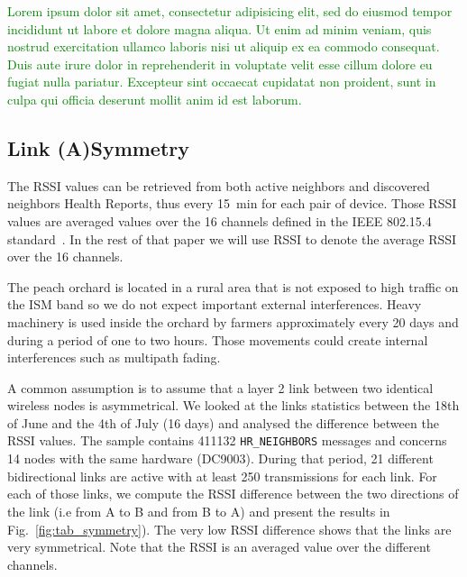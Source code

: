 \documentclass{sig-alternate}
\newcommand{\lorem}          {\textcolor{green}{Lorem ipsum dolor sit amet, consectetur adipisicing elit, sed do eiusmod tempor incididunt ut labore et dolore magna aliqua. Ut enim ad minim veniam, quis nostrud exercitation ullamco laboris nisi ut aliquip ex ea commodo consequat. Duis aute irure dolor in reprehenderit in voluptate velit esse cillum dolore eu fugiat nulla pariatur. Excepteur sint occaecat cupidatat non proident, sunt in culpa qui officia deserunt mollit anim id est laborum.}}
\newcommand{\HRNEIGHBORS}    {{\tt HR\_NEIGHBORS}\xspace}
\begin{document}
\lorem

\subsection{Link (A)Symmetry}
\label{sec:symmetry}


The RSSI values can be retrieved from both active neighbors and discovered neighbors Health Reports, thus every 15~min for each pair of device.
Those RSSI values are averaged values over the 16 channels defined in the IEEE 802.15.4 standard~\cite{std_ieee802154_2011}.
In the rest of that paper we will use RSSI to denote the average RSSI over the 16 channels.


The peach orchard is located in a rural area that is not exposed to high traffic on the ISM band so we do not expect important external interferences.
Heavy machinery is used inside the orchard by farmers approximately every 20 days and during a period of one to two hours.
Those movements could create internal interferences such as multipath fading.


A common assumption is to assume that a layer 2 link between two identical wireless nodes is asymmetrical.
We looked at the links statistics between the 18th of June and the 4th of July (16 days) and analysed the difference between the RSSI values.
The sample contains 411132 \HRNEIGHBORS messages and concerns 14 nodes with the same hardware (DC9003).
During that period, 21 different bidirectional links are active with at least 250 transmissions for each link.
For each of those links, we compute the RSSI difference between the two directions of the link (i.e from A to B and from B to A) and present the results in Fig.~\ref{fig:tab_symmetry}).
The very low RSSI difference shows that the links are very symmetrical.
Note that the RSSI is an averaged value over the different channels.
\end{document}

